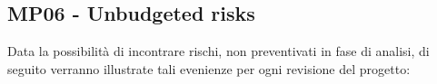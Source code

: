 \subsection{MP06 - Unbudgeted risks}
Data la possibilità di incontrare rischi, non preventivati in fase di analisi, di seguito verranno illustrate tali evenienze per ogni revisione del progetto:
